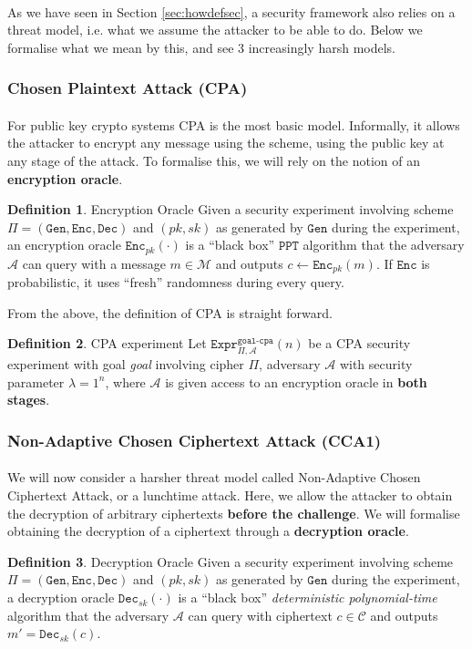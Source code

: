 \documentclass{article}
\theoremstyle{definition}
\newtheorem{definition}{Definition}[section]
\newcommand{\Enc}{\texttt{Enc}}
\newcommand{\Dec}{\texttt{Dec}}
\newcommand{\Gen}{\texttt{Gen}}
\newcommand{\M}{\mathcal{M}}
\renewcommand{\C}{\mathcal{C}}
\newcommand{\A}{\mathcal{A}}
\newcommand{\PPT}{\texttt{PPT}}
\newcommand{\Expr}[2]{\texttt{Expr}^{\texttt{#1}}_{#2}}
\begin{document}
\paragraph{} As we have seen in Section \ref{sec:howdefsec}, a security
framework also relies on a threat model, i.e. what we assume the attacker to be
able to do. Below we formalise what we mean by this, and see 3 increasingly
harsh models.
\subsubsection{Chosen Plaintext Attack (CPA)}
\paragraph{} For public key crypto systems CPA is the most basic model.
Informally, it allows the attacker to encrypt any message using the scheme,
using the public key at any stage of the attack. To formalise this, we will rely
on the notion of an \textbf{encryption oracle}.
\begin{definition}{Encryption Oracle}
  Given a security experiment involving scheme $\Pi = (\Gen, \Enc, \Dec)$ and
  $(pk, sk)$ as generated by $\Gen$ during the experiment, an encryption oracle
  $\Enc_{pk}(\cdot)$ is a ``black box'' $\PPT$ algorithm that the adversary $\A$ 
  can query with a message $m\in \M$ and outputs $c \leftarrow \Enc_{pk}(m)$. If
  $\Enc$ is probabilistic, it uses ``fresh'' randomness during every query.
\end{definition}
From the above, the definition of CPA is straight forward.
\begin{definition}{CPA experiment}
  Let $\Expr{goal-cpa}{\Pi, \A}(n)$ be a CPA security experiment with goal
  \textit{goal} involving cipher $\Pi$, adversary $\A$ with security parameter $\lambda = 1^n$, where
  $\A$ is given access to an encryption oracle in \textbf{both stages}.
\end{definition}
\subsubsection{Non-Adaptive Chosen Ciphertext Attack (CCA1)}
\paragraph{} We will now consider a harsher threat model called Non-Adaptive
Chosen Ciphertext Attack, or a lunchtime attack. Here, we allow the attacker to
obtain the decryption of arbitrary ciphertexts \textbf{before the challenge}.
We will formalise obtaining the decryption of a ciphertext through a
\textbf{decryption oracle}.
\begin{definition}{Decryption Oracle}
  Given a security experiment involving scheme $\Pi = (\Gen, \Enc, \Dec)$ and
  $(pk, sk)$ as generated by $\Gen$ during the experiment, a decryption oracle
  $\Dec_{sk}(\cdot)$ is a ``black box'' \textit{deterministic polynomial-time}
  algorithm that the adversary $\A$ can query with ciphertext $c\in \C$ and
  outputs $m' = \Dec_{sk}(c)$.
\end{definition}
\end{document}
